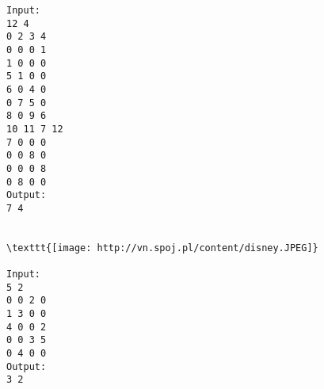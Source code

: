 \begin{verbatim}
Input:
12 4
0 2 3 4
0 0 0 1
1 0 0 0
5 1 0 0
6 0 4 0
0 7 5 0
8 0 9 6
10 11 7 12
7 0 0 0
0 0 8 0
0 0 0 8
0 8 0 0
Output:
7 4


\texttt{[image: http://vn.spoj.pl/content/disney.JPEG]}

Input:
5 2
0 0 2 0
1 3 0 0
4 0 0 2
0 0 3 5
0 4 0 0
Output:
3 2

\end{verbatim}